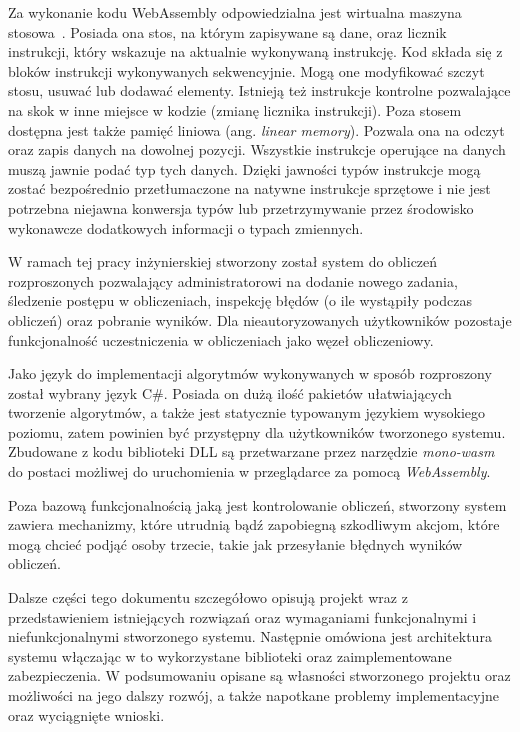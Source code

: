 \documentclass[a4paper,11pt,twoside]{report}
\theoremstyle{definition}
\begin{document}
    Za wykonanie kodu WebAssembly odpowiedzialna jest wirtualna maszyna stosowa~\cite{webassembly-semantics}.
    Posiada ona stos, na którym zapisywane są dane, oraz licznik instrukcji, który wskazuje
    na aktualnie wykonywaną instrukcję.
    Kod składa się z bloków instrukcji wykonywanych sekwencyjnie.
    Mogą one modyfikować szczyt stosu, usuwać lub dodawać elementy.
    Istnieją też instrukcje kontrolne pozwalające na skok w inne miejsce w kodzie (zmianę licznika instrukcji).
    Poza stosem dostępna jest także pamięć liniowa (ang. \textit{linear memory}).
    Pozwala ona na odczyt oraz zapis danych na dowolnej pozycji.
    Wszystkie instrukcje operujące na danych muszą jawnie podać typ tych danych.
    Dzięki jawności typów instrukcje mogą zostać bezpośrednio przetłumaczone na natywne instrukcje
    sprzętowe
    i nie jest potrzebna niejawna konwersja typów lub przetrzymywanie przez środowisko wykonawcze
    dodatkowych informacji o typach zmiennych.
    
    W ramach tej pracy inżynierskiej stworzony został system do obliczeń rozproszonych pozwalający
    administratorowi na dodanie nowego zadania, śledzenie postępu w obliczeniach, inspekcję
    błędów (o ile wystąpiły podczas obliczeń) oraz pobranie wyników.
    Dla nieautoryzowanych użytkowników pozostaje funkcjonalność uczestniczenia w obliczeniach jako węzeł obliczeniowy.

    Jako język do implementacji algorytmów wykonywanych w sposób rozproszony został wybrany język C\#.
    Posiada on dużą ilość pakietów ułatwiających tworzenie algorytmów,
    a także jest statycznie typowanym językiem wysokiego poziomu,
    zatem powinien być przystępny dla użytkowników tworzonego systemu.
    Zbudowane z kodu biblioteki DLL są przetwarzane przez narzędzie \textit{mono-wasm}
    do postaci możliwej do uruchomienia w przeglądarce za pomocą \textit{WebAssembly}.
    
    Poza bazową funkcjonalnością jaką jest kontrolowanie obliczeń, stworzony system zawiera
    mechanizmy, które utrudnią bądź zapobiegną szkodliwym akcjom, które mogą chcieć
    podjąć osoby trzecie, takie jak przesyłanie błędnych wyników obliczeń.
    
    Dalsze części tego dokumentu szczegółowo opisują projekt wraz z przedstawieniem istniejących
    rozwiązań oraz wymaganiami funkcjonalnymi i niefunkcjonalnymi stworzonego systemu.
    Następnie omówiona jest architektura systemu włączając w to wykorzystane biblioteki oraz zaimplementowane zabezpieczenia.
    W podsumowaniu opisane są własności stworzonego projektu oraz możliwości na jego dalszy rozwój, a także napotkane problemy implementacyjne oraz wyciągnięte wnioski.
\end{document}
